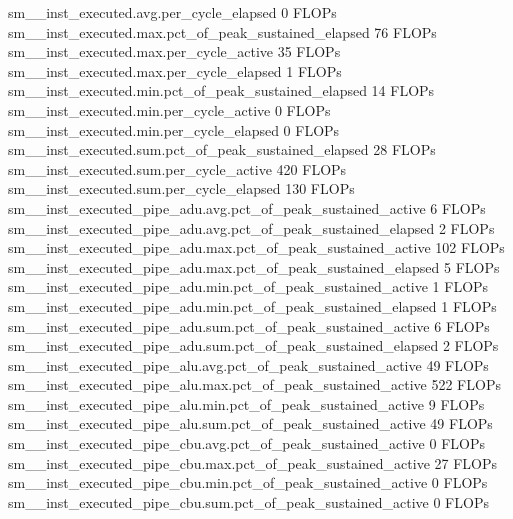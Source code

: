 sm__inst_executed.avg.per_cycle_elapsed                                                        0 FLOPs
sm__inst_executed.max.pct_of_peak_sustained_elapsed                                           76 FLOPs
sm__inst_executed.max.per_cycle_active                                                        35 FLOPs
sm__inst_executed.max.per_cycle_elapsed                                                        1 FLOPs
sm__inst_executed.min.pct_of_peak_sustained_elapsed                                           14 FLOPs
sm__inst_executed.min.per_cycle_active                                                         0 FLOPs
sm__inst_executed.min.per_cycle_elapsed                                                        0 FLOPs
sm__inst_executed.sum.pct_of_peak_sustained_elapsed                                           28 FLOPs
sm__inst_executed.sum.per_cycle_active                                                       420 FLOPs
sm__inst_executed.sum.per_cycle_elapsed                                                      130 FLOPs
sm__inst_executed_pipe_adu.avg.pct_of_peak_sustained_active                                    6 FLOPs
sm__inst_executed_pipe_adu.avg.pct_of_peak_sustained_elapsed                                   2 FLOPs
sm__inst_executed_pipe_adu.max.pct_of_peak_sustained_active                                  102 FLOPs
sm__inst_executed_pipe_adu.max.pct_of_peak_sustained_elapsed                                   5 FLOPs
sm__inst_executed_pipe_adu.min.pct_of_peak_sustained_active                                    1 FLOPs
sm__inst_executed_pipe_adu.min.pct_of_peak_sustained_elapsed                                   1 FLOPs
sm__inst_executed_pipe_adu.sum.pct_of_peak_sustained_active                                    6 FLOPs
sm__inst_executed_pipe_adu.sum.pct_of_peak_sustained_elapsed                                   2 FLOPs
sm__inst_executed_pipe_alu.avg.pct_of_peak_sustained_active                                   49 FLOPs
sm__inst_executed_pipe_alu.max.pct_of_peak_sustained_active                                  522 FLOPs
sm__inst_executed_pipe_alu.min.pct_of_peak_sustained_active                                    9 FLOPs
sm__inst_executed_pipe_alu.sum.pct_of_peak_sustained_active                                   49 FLOPs
sm__inst_executed_pipe_cbu.avg.pct_of_peak_sustained_active                                    0 FLOPs
sm__inst_executed_pipe_cbu.max.pct_of_peak_sustained_active                                   27 FLOPs
sm__inst_executed_pipe_cbu.min.pct_of_peak_sustained_active                                    0 FLOPs
sm__inst_executed_pipe_cbu.sum.pct_of_peak_sustained_active                                    0 FLOPs
